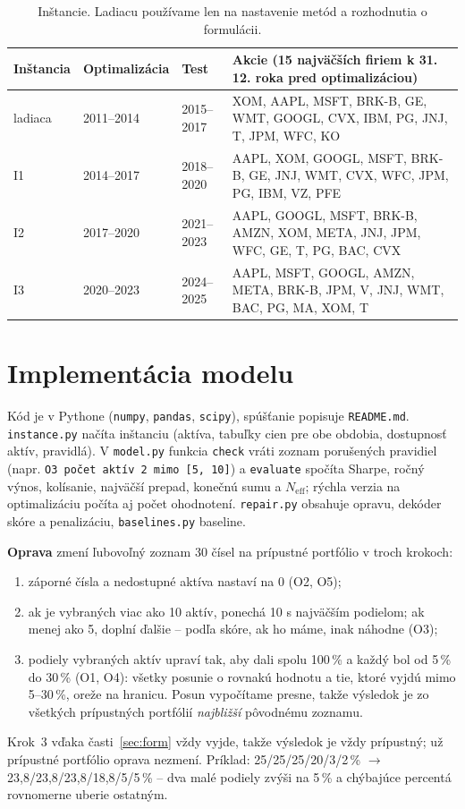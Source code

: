 \documentclass[10pt,a4paper]{article}
\begin{document}
\begin{table}[!ht]
\centering\small
\caption{Inštancie. Ladiacu používame len na nastavenie metód a rozhodnutia o formulácii.}
\label{tab:inst}
\begin{tabularx}{\textwidth}{@{}lllL@{}}
\toprule
Inštancia & Optimalizácia & Test & Akcie (15 najväčších firiem k 31.\,12. roka pred optimalizáciou) \\
\midrule
ladiaca & 2011--2014 & 2015--2017 & XOM, AAPL, MSFT, BRK-B, GE, WMT, GOOGL, CVX, IBM, PG, JNJ, T, JPM, WFC, KO \\
I1 & 2014--2017 & 2018--2020 & AAPL, XOM, GOOGL, MSFT, BRK-B, GE, JNJ, WMT, CVX, WFC, JPM, PG, IBM, VZ, PFE \\
I2 & 2017--2020 & 2021--2023 & AAPL, GOOGL, MSFT, BRK-B, AMZN, XOM, META, JNJ, JPM, WFC, GE, T, PG, BAC, CVX \\
I3 & 2020--2023 & 2024--2025 & AAPL, MSFT, GOOGL, AMZN, META, BRK-B, JPM, V, JNJ, WMT, BAC, PG, MA, XOM, T \\
\bottomrule
\end{tabularx}
\end{table}

\section{Implementácia modelu}
\label{sec:impl}

Kód je v Pythone (\texttt{numpy}, \texttt{pandas}, \texttt{scipy}), spúšťanie popisuje \texttt{README.md}.
\texttt{instance.py} načíta inštanciu (aktíva, tabuľky cien pre obe obdobia, dostupnosť aktív, pravidlá).
V \texttt{model.py} funkcia \texttt{check} vráti zoznam porušených pravidiel
(napr. \texttt{O3 počet aktív 2 mimo [5, 10]}) a \texttt{evaluate} spočíta Sharpe, ročný výnos,
kolísanie, najväčší prepad, konečnú sumu a $N_\text{eff}$; rýchla verzia na optimalizáciu počíta aj
počet ohodnotení. \texttt{repair.py} obsahuje opravu, dekóder
skóre a penalizáciu, \texttt{baselines.py} baseline.

\textbf{Oprava} zmení ľubovoľný zoznam 30 čísel na prípustné portfólio v troch krokoch:
\begin{enumerate}
\item záporné čísla a nedostupné aktíva nastaví na 0 (O2, O5);
\item ak je vybraných viac ako 10 aktív, ponechá 10 s najväčším podielom; ak menej ako 5,
  doplní ďalšie -- podľa skóre, ak ho máme, inak náhodne (O3);
\item podiely vybraných aktív upraví tak, aby dali spolu 100\,\% a každý bol od 5\,\% do 30\,\% (O1, O4):
  všetky posunie o rovnakú hodnotu a tie, ktoré vyjdú mimo 5--30\,\%, oreže na hranicu.
  Posun vypočítame presne, takže výsledok je zo všetkých prípustných portfólií \emph{najbližší}
  pôvodnému zoznamu.
\end{enumerate}
Krok~3 vďaka časti~\ref{sec:form} vždy vyjde, takže výsledok je vždy prípustný; už prípustné portfólio
oprava nezmení. Príklad: 25/25/25/20/3/2\,\% $\to$ 23,8/23,8/23,8/18,8/5/5\,\% -- dva malé podiely zvýši
na 5\,\% a chýbajúce percentá rovnomerne uberie ostatným.
\end{document}
